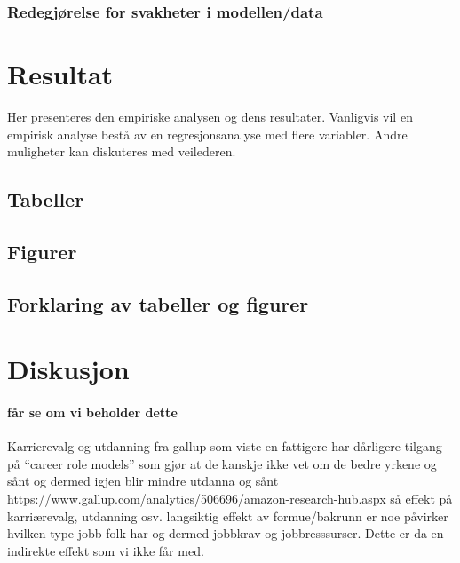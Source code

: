 \documentclass[
  12pt,
  a4paper,
  DIV=11,
  numbers=noendperiod]{scrartcl}
\let\oldparagraph\paragraph
\renewcommand{\paragraph}[1]{\oldparagraph{#1}\mbox{}}
\begin{document}
\subsubsection{Redegjørelse for svakheter i
modellen/data}\label{redegjuxf8relse-for-svakheter-i-modellendata}

\newpage

\section{Resultat}\label{resultat}

Her presenteres den empiriske analysen og dens resultater. Vanligvis vil
en empirisk analyse bestå av en regresjonsanalyse med flere variabler.
Andre muligheter kan diskuteres med veilederen.

\subsection{Tabeller}\label{tabeller}

\subsection{Figurer}\label{figurer}

\subsection{Forklaring av tabeller og
figurer}\label{forklaring-av-tabeller-og-figurer}

\newpage

\section{Diskusjon}\label{diskusjon}

\paragraph{får se om vi beholder
dette}\label{fuxe5r-se-om-vi-beholder-dette}

Karrierevalg og utdanning fra gallup som viste en fattigere har
dårligere tilgang på ``career role models'' som gjør at de kanskje ikke
vet om de bedre yrkene og sånt og dermed igjen blir mindre utdanna og
sånt https://www.gallup.com/analytics/506696/amazon-research-hub.aspx så
effekt på karriærevalg, utdanning osv. langsiktig effekt av
formue/bakrunn er noe påvirker hvilken type jobb folk har og dermed
jobbkrav og jobbresssurser. Dette er da en indirekte effekt som vi ikke
får med.
\end{document}
